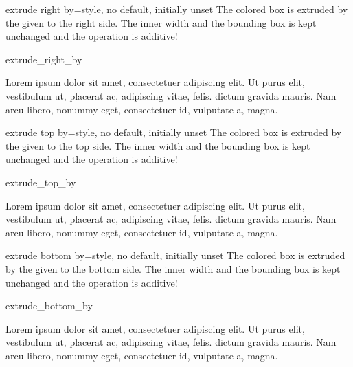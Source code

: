\begin{docTcbKey}[][doc updated=2014-09-19]{extrude right by}{=}{style, no default, initially unset}
  The colored box is extruded by the given  to the right side.
  The inner width and the bounding box is kept unchanged and the operation
  is additive!
\begin{exdispExample}{extrude_right_by}

Lorem ipsum dolor sit amet, consectetuer adipiscing elit. Ut purus elit,
vestibulum ut, placerat ac, adipiscing vitae, felis.
 dictum gravida mauris.
Nam arcu libero, nonummy eget, consectetuer id, vulputate a, magna.
\end{exdispExample}
\end{docTcbKey}

\clearpage
\begin{docTcbKey}{extrude top by}{=}{style, no default, initially unset}
  The colored box is extruded by the given  to the top side.
  The inner width and the bounding box is kept unchanged and the operation
  is additive!
\begin{exdispExample}{extrude_top_by}

Lorem ipsum dolor sit amet, consectetuer adipiscing elit. Ut purus elit,
vestibulum ut, placerat ac, adipiscing vitae, felis.
 dictum gravida mauris.
Nam arcu libero, nonummy eget, consectetuer id, vulputate a, magna.
\end{exdispExample}
\end{docTcbKey}

\begin{docTcbKey}{extrude bottom by}{=}{style, no default, initially unset}
  The colored box is extruded by the given  to the bottom side.
  The inner width and the bounding box is kept unchanged and the operation
  is additive!
\begin{exdispExample}[safety=1cm]{extrude_bottom_by}

Lorem ipsum dolor sit amet, consectetuer adipiscing elit. Ut purus elit,
vestibulum ut, placerat ac, adipiscing vitae, felis.
 dictum gravida mauris.
Nam arcu libero, nonummy eget, consectetuer id, vulputate a, magna.
\end{exdispExample}
\end{docTcbKey}

